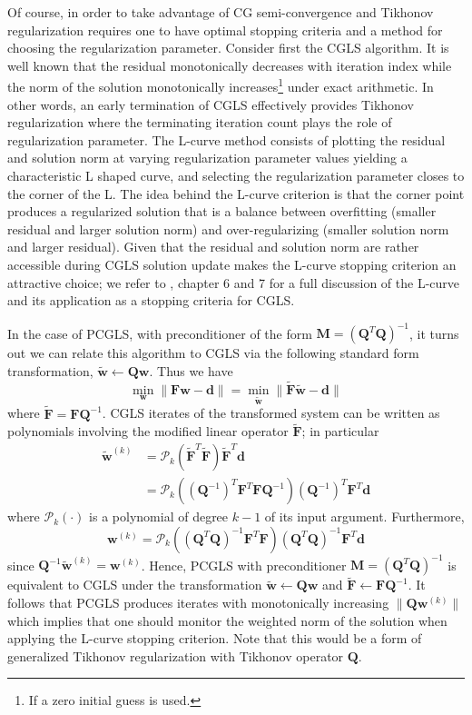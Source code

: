 Of course, in order to take advantage of CG semi-convergence and Tikhonov regularization requires one to have optimal stopping criteria and a method for choosing the regularization parameter.
Consider first the CGLS algorithm.
It is well known that the residual monotonically decreases with iteration index while the norm of the solution monotonically increases\footnote{If a zero initial guess is used.} under exact arithmetic.
In other words, an early termination of CGLS effectively provides Tikhonov regularization where the terminating iteration count plays the role of regularization parameter.
The L-curve method consists of plotting the residual and solution norm at varying regularization parameter values yielding a characteristic L shaped curve, and selecting the regularization parameter closes to the corner of the L. 
The idea behind the L-curve criterion is that the corner point produces a regularized solution that is a balance between overfitting (smaller residual and larger solution norm) and over-regularizing (smaller solution norm and larger residual).
Given that the residual and solution norm are rather accessible during CGLS solution update makes the L-curve stopping criterion an attractive choice;
we refer to \cite{Hansen:05}, chapter 6 and 7 for a full discussion of the L-curve and its application as a stopping criteria for CGLS. 

In the case of PCGLS, with preconditioner of the form $\mathbf M = (\mathbf Q^T\mathbf Q)^{-1}$, it turns out we can relate this algorithm to CGLS via the following standard form transformation, $\tilde{\mathbf w}\leftarrow \mathbf Q \mathbf w$.
Thus we have
\[
	\min_{\mathbf w} \|\mathbf F \mathbf w -\mathbf d \| 
	= \min_{\tilde{\mathbf w}}\| \tilde{\mathbf F} \tilde{\mathbf w} -\mathbf d\|
\]
where $\tilde {\mathbf F} = \mathbf F \mathbf Q^{-1}$.
CGLS iterates of the transformed system can be written as polynomials involving the modified linear operator $\tilde{\mathbf F}$; in particular
\begin{align*}
	\tilde {\mathbf w}^{(k)} 
		&= \mathcal P_k(\tilde{\mathbf F}^T \tilde{\mathbf F})\tilde{\mathbf F}^T \mathbf d \\
		&= \mathcal P_k( (\mathbf Q^{-1})^T \mathbf F^T \mathbf F \mathbf Q^{-1} ) (\mathbf Q^{-1})^T \mathbf F^T \mathbf d
\end{align*}
where $\mathcal P_k(\cdot)$ is a polynomial of degree $k-1$ of its input argument.
Furthermore,
\[
	\mathbf w^{(k)} = \mathcal P_k( (\mathbf Q^T\mathbf Q)^{-1} \mathbf F^T \mathbf F) (\mathbf Q^T\mathbf Q)^{-1} \mathbf F^T \mathbf d
\]
since $\mathbf Q^{-1} \tilde {\mathbf w}^{(k)} = \mathbf w^{(k)}$.
Hence, PCGLS with preconditioner $\mathbf M = (\mathbf Q^T\mathbf Q)^{-1}$ is equivalent to CGLS under the transformation $\tilde{\mathbf w}\leftarrow \mathbf Q\mathbf w$ and $\tilde{\mathbf F}\leftarrow \mathbf F\mathbf Q^{-1}$.
It follows that PCGLS produces iterates with monotonically increasing $\|\mathbf Q\mathbf w^{(k)}\|$ which implies that one should monitor the weighted norm of the solution when applying the L-curve stopping criterion.
Note that this would be a form of generalized Tikhonov regularization with Tikhonov operator $\mathbf Q$.

